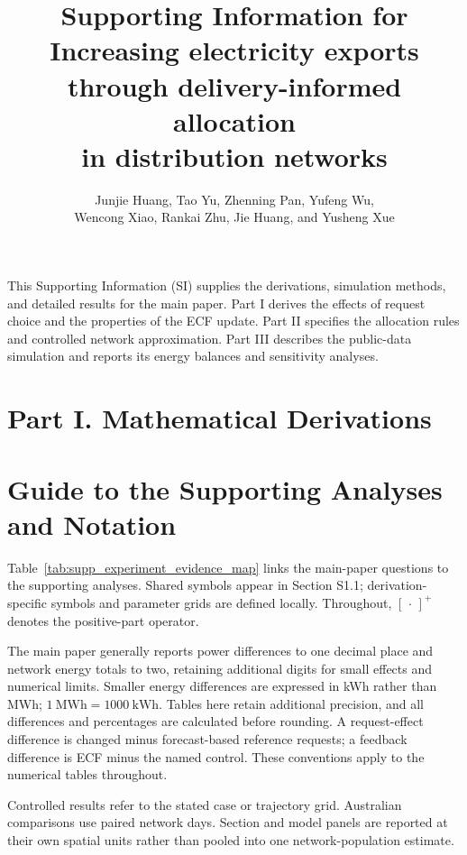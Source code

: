 \documentclass[11pt]{article}
\title{Supporting Information for\\[0.5em]
\textbf{Increasing electricity exports through delivery-informed allocation\\
in distribution networks}}
\author{Junjie Huang, Tao Yu, Zhenning Pan, Yufeng Wu,\\
Wencong Xiao, Rankai Zhu, Jie Huang, and Yusheng Xue}
\date{}
\begin{document}
\maketitle

This Supporting Information (SI) supplies the derivations, simulation methods,
and detailed results for the main paper. Part I derives the effects of request
choice and the properties of the ECF update. Part II specifies the allocation
rules and controlled network approximation. Part III describes the public-data
simulation and reports its energy balances and sensitivity analyses.

\renewcommand{\thesection}{S\arabic{section}}
\renewcommand{\theequation}{S\arabic{equation}}
\renewcommand{\thefigure}{S\arabic{figure}}
\renewcommand{\thetable}{S\arabic{table}}
\setcounter{section}{0}
\setcounter{equation}{0}

\section*{Part I. Mathematical Derivations}

\section{Guide to the Supporting Analyses and Notation}
\label{supp:scope}

Table~\ref{tab:supp_experiment_evidence_map} links the main-paper questions to
the supporting analyses.
Shared symbols appear in Section S1.1; derivation-specific symbols and parameter
grids are defined locally. Throughout, $[\,\cdot\,]^+$ denotes the positive-part
operator.

The main paper generally reports power differences to one decimal place and
network energy totals to two, retaining additional digits for small effects
and numerical limits. Smaller energy differences are expressed in kWh rather
than MWh; $1~\mathrm{MWh}=1000~\mathrm{kWh}$. Tables here retain additional
precision, and all differences and percentages are calculated before rounding.
A request-effect difference is changed minus forecast-based reference requests;
a feedback difference is ECF minus the named control. These conventions apply
to the numerical tables throughout.

Controlled results refer to the stated case or trajectory grid. Australian
comparisons use paired network days. Section and model panels are reported at
their own spatial units rather than pooled into one network-population estimate.
\end{document}

